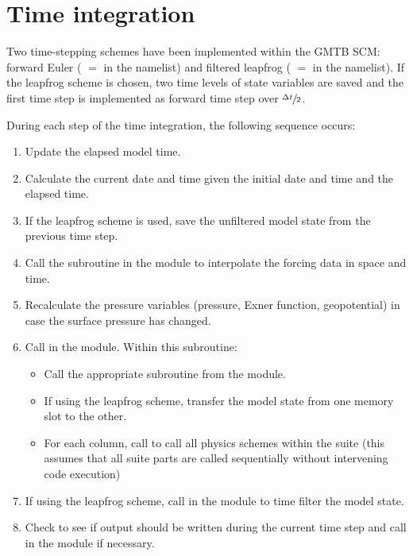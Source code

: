 \section{Time integration}
\label{section: time integration}
Two time-stepping schemes have been implemented within the GMTB SCM: forward Euler ( $=$  in the  namelist) and filtered leapfrog ( $=$  in the  namelist). If the leapfrog scheme is chosen, two time levels of state variables are saved and the first time step is implemented as forward time step over $\sfrac{\Delta t}{2}$.

During each step of the time integration, the following sequence occurs:
\begin{enumerate}
\item Update the elapsed model time.
\item Calculate the current date and time given the initial date and time and the elapsed time.
\item If the leapfrog scheme is used, save the unfiltered model state from the previous time step.
\item Call the  subroutine in the  module to interpolate the forcing data in space and time.
\item Recalculate the pressure variables (pressure, Exner function, geopotential) in case the surface pressure has changed.
\item Call  in the  module. Within this subroutine:
\begin{itemize}
\item Call the appropriate  subroutine from the  module.
\item If using the leapfrog scheme, transfer the model state from one memory slot to the other.
\item For each column, call  to call all physics schemes within the suite (this assumes that all suite parts are called sequentially without intervening code execution)
\end{itemize}
\item If using the leapfrog scheme, call  in the  module to time filter the model state.
\item Check to see if output should be written during the current time step and call  in the  module if necessary.
\end{enumerate}

